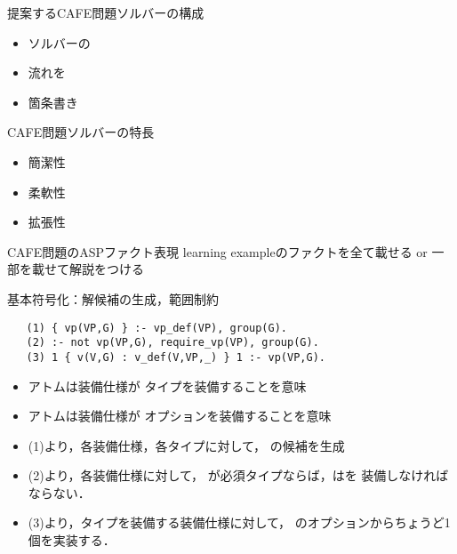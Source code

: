 \documentclass[dvipdfmx, 11pt]{beamer}
\begin{document}
 \begin{frame}{提案するCAFE問題ソルバーの構成}
  \scalebox{0.9}{%
  \centering
  
  }
  \begin{itemize}
   \item ソルバーの
   \item 流れを
   \item 箇条書き
  \end{itemize}
   \begin{block}{CAFE問題ソルバーの特長}
    \begin{itemize}
     \item 簡潔性
     \item 柔軟性
     \item 拡張性
    \end{itemize}
   \end{block}
 \end{frame}
\begin{frame}{CAFE問題のASPファクト表現}
 learning exampleのファクトを全て載せる or 一部を載せて解説をつける
\end{frame}
\begin{frame}[fragile]{基本符号化：解候補の生成，範囲制約}
 \begin{exampleblock}{}
  \begin{lstlisting}
   (1) { vp(VP,G) } :- vp_def(VP), group(G). 
   (2) :- not vp(VP,G), require_vp(VP), group(G).
   (3) 1 { v(V,G) : v_def(V,VP,_) } 1 :- vp(VP,G).
  \end{lstlisting}
 \end{exampleblock}
 \begin{itemize}
  \item アトムは装備仕様が
   	タイプを装備することを意味
  \item アトムは装備仕様が
	オプションを装備することを意味
  \item (1)より，各装備仕様，各タイプに対して，
	の候補を生成
  \item (2)より，各装備仕様に対して，
	が必須タイプならば，はを
	装備しなければならない．
  \item (3)より，タイプを装備する装備仕様に対して，
	のオプションからちょうど1個を実装する．
  \end{itemize}
\end{frame}
\end{document}
